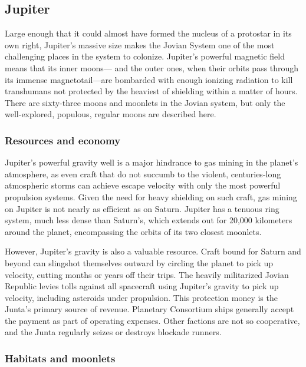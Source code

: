 \subsection{Jupiter} \label{sec:jupiter} 

Large enough that it could almost have formed the nucleus of a protostar in its own right, Jupiter's massive size makes the Jovian System one of the most challenging places in the system to colonize. Jupiter's powerful magnetic field means that its inner moons— and the outer ones, when their orbits pass through its immense magnetotail—are bombarded with enough ionizing radiation to kill transhumans not protected by the heaviest of shielding within a matter of hours. There are sixty-three moons and moonlets in the Jovian system, but only the well-explored, populous, regular moons are described here. 

\subsubsection{Resources and economy} \label{sec:jupiter-resources-economy} 

Jupiter's powerful gravity well is a major hindrance to gas mining in the planet's atmosphere, as even craft that do not succumb to the violent, centuries-long atmospheric storms can achieve escape velocity with only the most powerful propulsion systems. Given the need for heavy shielding on such craft, gas mining on Jupiter is not nearly as efficient as on Saturn. Jupiter has a tenuous ring system, much less dense than Saturn's, which extends out for 20,000 kilometers around the planet, encompassing the orbits of its two closest moonlets. 

However, Jupiter's gravity is also a valuable resource. Craft bound for Saturn and beyond can slingshot themselves outward by circling the planet to pick up velocity, cutting months or years off their trips. The heavily militarized Jovian Republic levies tolls against all spacecraft using Jupiter's gravity to pick up velocity, including asteroids under propulsion. This protection money is the Junta's primary source of revenue. Planetary Consortium ships generally accept the payment as part of operating expenses. Other factions are not so cooperative, and the Junta regularly seizes or destroys blockade runners. 

\subsubsection{Habitats and moonlets} \label{sec:habitats-moonlets} 

